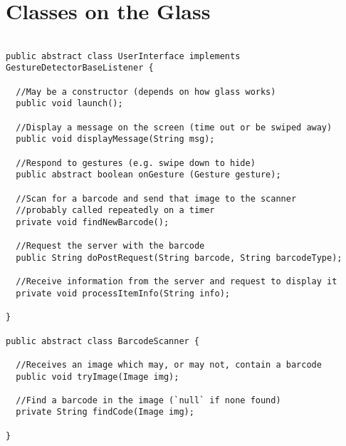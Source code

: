 \documentclass[12pt,a4paper]{report}
\begin{document}
\section{Classes on the Glass}

\begin{lstlisting}

public abstract class UserInterface implements GestureDetectorBaseListener {

  //May be a constructor (depends on how glass works)
  public void launch();

  //Display a message on the screen (time out or be swiped away)
  public void displayMessage(String msg);

  //Respond to gestures (e.g. swipe down to hide)
  public abstract boolean onGesture (Gesture gesture);
	
  //Scan for a barcode and send that image to the scanner
  //probably called repeatedly on a timer
  private void findNewBarcode();

  //Request the server with the barcode
  public String doPostRequest(String barcode, String barcodeType);

  //Receive information from the server and request to display it
  private void processItemInfo(String info);

}

public abstract class BarcodeScanner {

  //Receives an image which may, or may not, contain a barcode
  public void tryImage(Image img);

  //Find a barcode in the image (`null` if none found)
  private String findCode(Image img);

}


	
\end{lstlisting}
\end{document}
